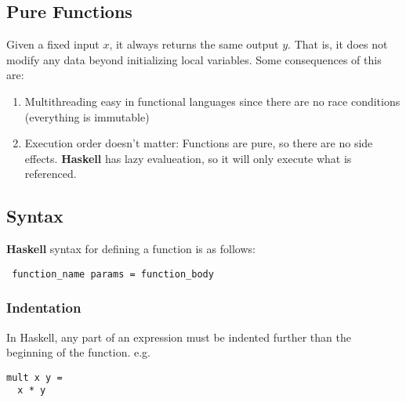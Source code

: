 \documentclass{article}
\begin{document}
\subsection{Pure Functions} Given a fixed input $x$, it always returns
the same output $y$. That is, it does not modify any data beyond
initializing local variables. Some consequences of this are:
\begin{enumerate}[label=(\roman*),align=left]
\item Multithreading easy in functional languages since there are no
  race conditions (everything is immutable)
\item Execution order doesn't matter: Functions are pure, so there are
  no side effects. \textbf{Haskell} has lazy evalueation, so it will
  only execute what is referenced.
\end{enumerate}





\subsection{Syntax} \textbf{Haskell} syntax for defining a function is
as follows: 
\begin{verbatim} function_name params = function_body \end{verbatim}





\subsubsection{Indentation} In Haskell, any part of an expression must be
indented further than the beginning of the function. e.g.
\begin{verbatim}
mult x y =
  x * y \end{verbatim}
\end{document}
